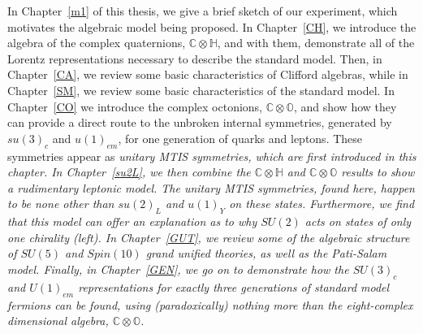 \documentclass[letterpaper,12pt,titlepage,oneside,final]{book}
\newcommand{\CH}{\mathbb{C}\otimes\mathbb{H}}
\newcommand{\CO}{\mathbb{C}\otimes\mathbb{O}}
\begin{document}
In Chapter~\ref{m1} of this thesis, we give a brief sketch of our experiment, which motivates the algebraic model being proposed.  In Chapter~\ref{CH}, we introduce the algebra of the complex quaternions, $\CH$, and with them, demonstrate all of the Lorentz representations necessary to describe  the standard model.  Then, in Chapter~\ref{CA}, we review some basic characteristics of Clifford algebras, while in Chapter~\ref{SM}, we review some basic characteristics of the standard model.  In Chapter~\ref{CO} we introduce the complex octonions, $\CO$, and show how they can provide a direct route to the unbroken internal symmetries, generated by $su(3)_c$ and $u(1)_{em}$, for one generation of quarks and leptons.  These symmetries appear as  \it unitary MTIS symmetries, \rm which are first introduced in this chapter.  In Chapter~\ref{su2L}, we then combine the $\CH$ and $\CO$ results to show a rudimentary leptonic model.  The unitary MTIS symmetries, found here,  happen to be none other than $su(2)_L$ and $u(1)_Y$ on these states.  Furthermore, we find that this model can offer an explanation as to why $SU(2)$ acts on states of only one chirality (left).   
In Chapter~\ref{GUT}, we review some of the algebraic structure of $SU(5)$ and $Spin(10)$ grand unified theories, as well as the Pati-Salam model.  Finally, in Chapter~\ref{GEN}, we go on to demonstrate how the $SU(3)_c$ and $U(1)_{em}$ representations for exactly three generations of standard model fermions can be found, using (paradoxically) nothing more than the eight-complex dimensional algebra, $\CO$.  



\end{document}
